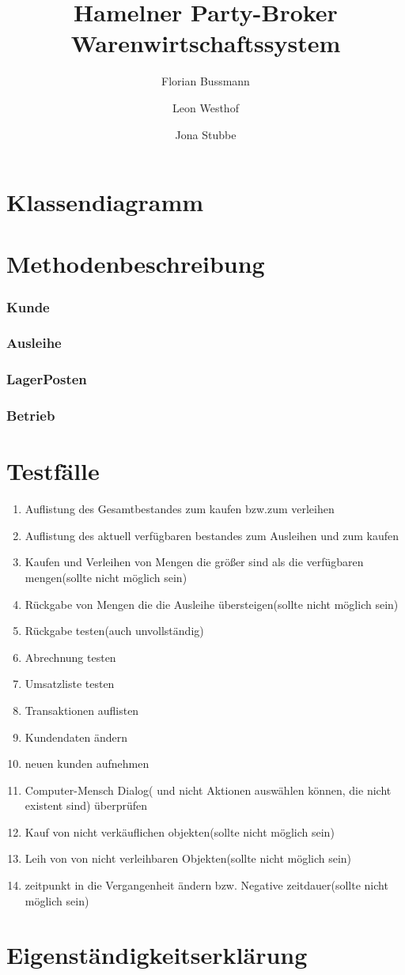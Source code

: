 \documentclass[a4paper,12pt]{article}
\title{Hamelner Party-Broker Warenwirtschaftssystem}
\author{Florian Bussmann \and Leon Westhof \and Jona Stubbe}
\begin{document}
\maketitle
\tableofcontents
\part{Klassendiagramm}
\part{Methodenbeschreibung}
\section{Kunde}
\section{Ausleihe}
\section{LagerPosten}
\section{Betrieb}
\part{Testfälle}
\begin{enumerate}
\item
Auflistung des Gesamtbestandes zum kaufen bzw.zum verleihen 
\item
Auflistung des aktuell verfügbaren bestandes zum Ausleihen und zum kaufen
\item
Kaufen und Verleihen von Mengen die größer sind als die verfügbaren mengen(sollte nicht möglich sein)
\item
Rückgabe von Mengen die die Ausleihe übersteigen(sollte nicht möglich sein)
\item
Rückgabe testen(auch unvollständig)
\item
Abrechnung testen
\item
Umsatzliste testen
\item
Transaktionen auflisten
\item
Kundendaten ändern 
\item
neuen kunden aufnehmen
\item
Computer-Mensch Dialog( und nicht Aktionen auswählen können, die nicht existent sind) überprüfen
\item
Kauf von nicht verkäuflichen objekten(sollte nicht möglich sein)
\item
Leih von von nicht verleihbaren Objekten(sollte nicht möglich sein)
\item
zeitpunkt in die Vergangenheit ändern bzw. Negative zeitdauer(sollte nicht möglich sein)

\end{enumerate}
\part{Eigenständigkeitserklärung}
\end{document}
